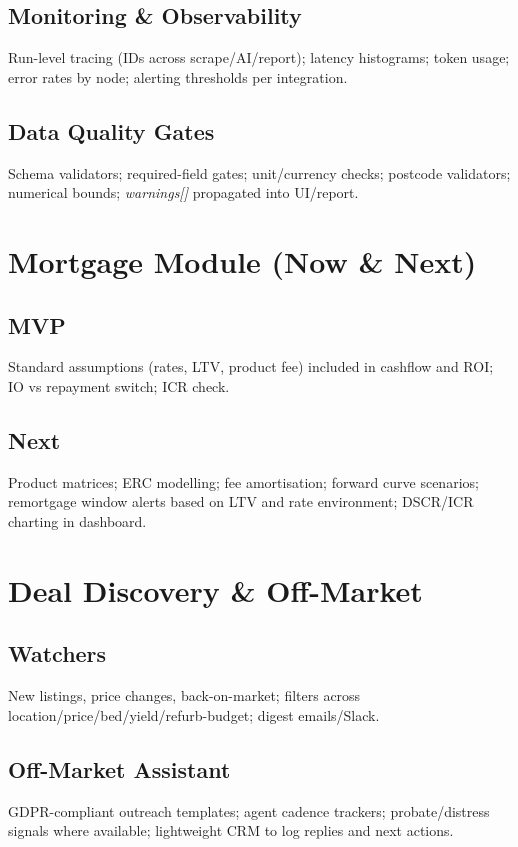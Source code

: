 \documentclass[12pt,a4paper]{article}
\begin{document}
\subsection{Monitoring \& Observability}
Run-level tracing (IDs across scrape/AI/report); latency histograms; token usage; error rates by node; alerting thresholds per integration.

\subsection{Data Quality Gates}
Schema validators; required-field gates; unit/currency checks; postcode validators; numerical bounds; \textit{warnings[]} propagated into UI/report.

\section{Mortgage Module (Now \& Next)}
\subsection{MVP}
Standard assumptions (rates, LTV, product fee) included in cashflow and ROI; IO vs repayment switch; ICR check.

\subsection{Next}
Product matrices; ERC modelling; fee amortisation; forward curve scenarios; remortgage window alerts based on LTV and rate environment; DSCR/ICR charting in dashboard.

\section{Deal Discovery \& Off-Market}
\subsection{Watchers}
New listings, price changes, back-on-market; filters across location/price/bed/yield/refurb-budget; digest emails/Slack.

\subsection{Off-Market Assistant}
GDPR-compliant outreach templates; agent cadence trackers; probate/distress signals where available; lightweight CRM to log replies and next actions.
\end{document}
